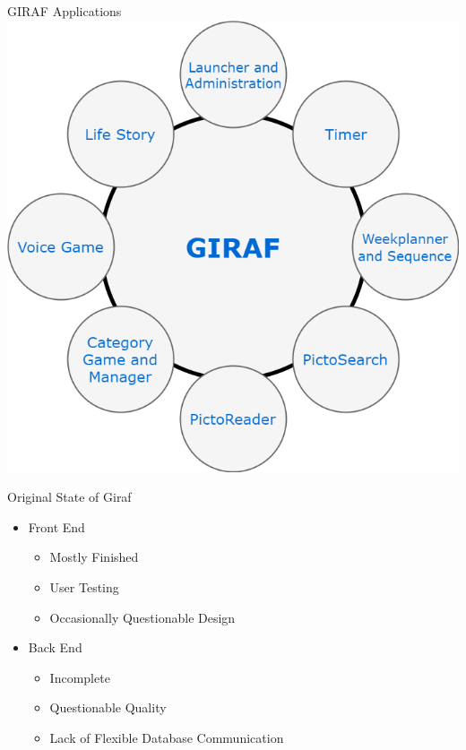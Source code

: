 \begin{frame}{GIRAF Applications}
\includegraphics[scale=0.32]{figures/GirafApps.png} 
\end{frame}

\begin{frame}{Original State of Giraf}
\begin{itemize}
	\item Front End
		\begin{itemize}
		    \item Mostly Finished
  			\item User Testing
  			\item Occasionally Questionable Design
		\end{itemize}
	\item Back End
		\begin{itemize}
		    \item Incomplete
		    \item Questionable Quality
		    \item Lack of Flexible Database Communication
		\end{itemize}
\end{itemize}
\end{frame}

